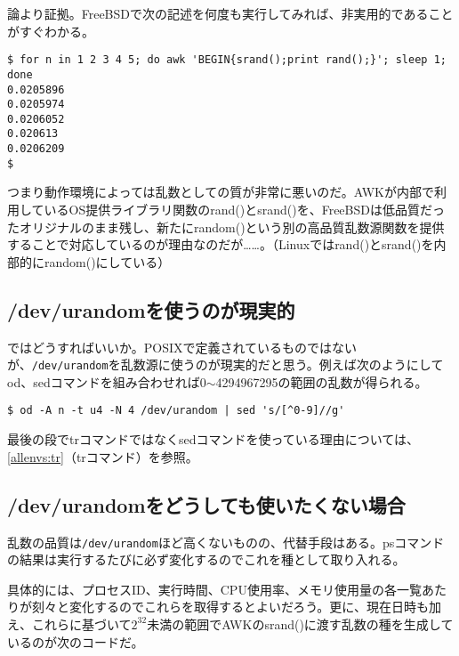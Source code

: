 論より証拠。FreeBSDで次の記述を何度も実行してみれば、非実用的であることがすぐわかる。

\begin{screen}
	\verb|$ for n in 1 2 3 4 5; do awk 'BEGIN{srand();print rand();}'; sleep 1; done| \return \\
	\verb|0.0205896| \\
	\verb|0.0205974| \\
	\verb|0.0206052| \\
	\verb|0.020613| \\
	\verb|0.0206209| \\
	\verb|$ |
\end{screen}

つまり動作環境によっては乱数としての質が非常に悪いのだ。AWKが内部で利用しているOS提供ライブラリ関数のrand()とsrand()を、FreeBSDは低品質だったオリジナルのまま残し、新たにrandom()という別の高品質乱数源関数を提供することで対応しているのが理由なのだが……。（Linuxではrand()とsrand()を内部的にrandom()にしている）

\subsection*{/dev/urandomを使うのが現実的}

ではどうすればいいか。POSIXで定義されているものではないが、\verb|/dev/urandom|を乱数源に使うのが現実的だと思う。例えば次のようにしてod、sedコマンドを組み合わせれば0$\sim$4294967295の範囲の乱数が得られる。

\begin{screen}
	\verb!$ od -A n -t u4 -N 4 /dev/urandom | sed 's/[^0-9]//g'! \return
\end{screen}

最後の段でtrコマンドではなくsedコマンドを使っている理由については、\ref{allenvs:tr}（trコマンド）を参照。

\subsection*{/dev/urandomをどうしても使いたくない場合}

乱数の品質は\verb|/dev/urandom|ほど高くないものの、代替手段はある。psコマンドの結果は実行するたびに必ず変化するのでこれを種として取り入れる。

具体的には、プロセスID、実行時間、CPU使用率、メモリ使用量の各一覧あたりが刻々と変化するのでこれらを取得するとよいだろう。更に、現在日時も加え、これらに基づいて$2^32$未満の範囲でAWKのsrand()に渡す乱数の種を生成しているのが次のコードだ。

